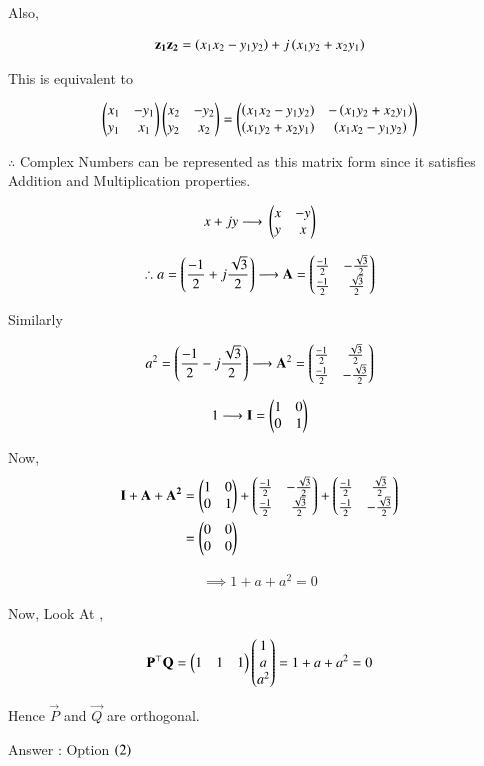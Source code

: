 \documentclass[journal]{IEEEtran}
\numberwithin{equation}{enumi}
\numberwithin{figure}{enumi}
\begin{document}
Also, 

\begin{align}
    \mathbf{z_1}\mathbf{z_2} = \left(x_1x_2 - y_1y_2\right) + j\left(x_1y_2 + x_2y_1\right)
\end{align}

This is equivalent to 

\begin{align}
    \begin{pmatrix}x_1 & -y_1 \\ y_1 & x_1\end{pmatrix}\begin{pmatrix}x_2 & -y_2 \\ y_2 & x_2 \end{pmatrix} = \begin{pmatrix}\left(x_1x_2 - y_1y_2\right) & -\left(x_1y_2 + x_2y_1\right) \\ \left(x_1y_2 + x_2y_1\right) & \left(x_1x_2 - y_1y_2\right)\end{pmatrix}
\end{align}

$\therefore$ Complex Numbers can be represented as this matrix form since it satisfies Addition and Multiplication properties. 
 
\begin{align}
    x+jy \longrightarrow{} \begin{pmatrix}x & -y \\ y & x \end{pmatrix}
\end{align}

\begin{align}
    \therefore a = \left(\frac{-1}{2} + j\frac{\sqrt{3}}{2}\right) \longrightarrow \mathbf{A} = \begin{pmatrix}\frac{-1}{2}&-\frac{\sqrt{3}}{2}\\\frac{-1}{2} & \frac{\sqrt{3}}{2}\end{pmatrix}
\end{align}

Similarly 

\begin{align}
    a^2 = \left(\frac{-1}{2} - j\frac{\sqrt{3}}{2}\right) \longrightarrow \mathbf{A}^2 = \begin{pmatrix}\frac{-1}{2}&\frac{\sqrt{3}}{2}\\\frac{-1}{2} & -\frac{\sqrt{3}}{2}\end{pmatrix}
\end{align}

\begin{align}
    1 \longrightarrow \mathbf{I} = \begin{pmatrix}1&0\\0&1\end{pmatrix}
\end{align}

Now, 
\begin{align}
    \mathbf{I} + \mathbf{A} + \mathbf{A^2} &= \begin{pmatrix}1&0\\0&1\end{pmatrix} + \begin{pmatrix}\frac{-1}{2}&-\frac{\sqrt{3}}{2}\\\frac{-1}{2} & \frac{\sqrt{3}}{2}\end{pmatrix} + \begin{pmatrix}\frac{-1}{2}&\frac{\sqrt{3}}{2}\\\frac{-1}{2} & -\frac{\sqrt{3}}{2}\end{pmatrix}\\ 
    &= \begin{pmatrix}0&0\\0&0\end{pmatrix}
\end{align}

\begin{align}
    \implies 1 + a + a^2 = 0 
\end{align}

Now, Look At , 

\begin{align}
    \mathbf{P}^{\top}\mathbf{Q} = \begin{pmatrix}1&1&1\end{pmatrix}\begin{pmatrix}1\\a\\a^2\end{pmatrix} = 1 + a + a^2 = 0 
\end{align}

Hence $\vec{P}$ and $\vec{Q}$ are orthogonal. 

Answer  : Option $\left(2\right)$
\end{document}
